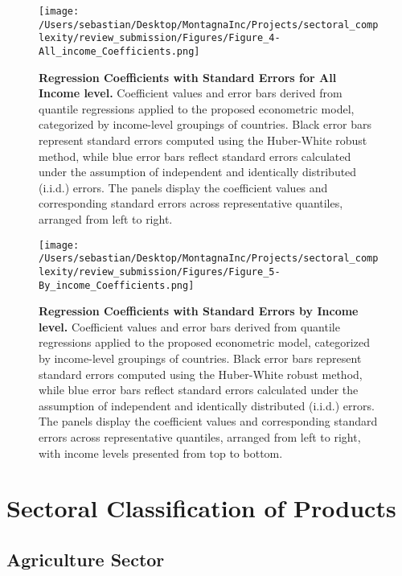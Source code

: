 \begin{appendices}
\begin{figure}[H]
		\centering
		\texttt{[image: /Users/sebastian/Desktop/MontagnaInc/Projects/sectoral\_complexity/review\_submission/Figures/Figure\_4-All\_income\_Coefficients.png]}
		\caption{\textbf{Regression Coefficients with Standard Errors for All Income level.} Coefficient values and error bars derived from quantile regressions applied to the proposed econometric model, categorized by income-level groupings of countries. Black error bars represent standard errors computed using the Huber-White robust method, while blue error bars reflect standard errors calculated under the assumption of independent and identically distributed (i.i.d.) errors. The panels display the coefficient values and corresponding standard errors across representative quantiles, arranged from left to right.}
		\label{fig:all_coefficients}
\end{figure}

\newpage

\begin{figure}[H]
		\centering
		\texttt{[image: /Users/sebastian/Desktop/MontagnaInc/Projects/sectoral\_complexity/review\_submission/Figures/Figure\_5-By\_income\_Coefficients.png]}
		\caption{\textbf{Regression Coefficients with Standard Errors by Income level.} Coefficient values and error bars derived from quantile regressions applied to the proposed econometric model, categorized by income-level groupings of countries. Black error bars represent standard errors computed using the Huber-White robust method, while blue error bars reflect standard errors calculated under the assumption of independent and identically distributed (i.i.d.) errors. The panels display the coefficient values and corresponding standard errors across representative quantiles, arranged from left to right, with income levels presented from top to bottom.}
		\label{fig:income_coefficients}
\end{figure}

\newpage

\section{Sectoral Classification of Products}
\label{annex:hs6-classification}

\subsection{Agriculture Sector}


\end{appendices}
